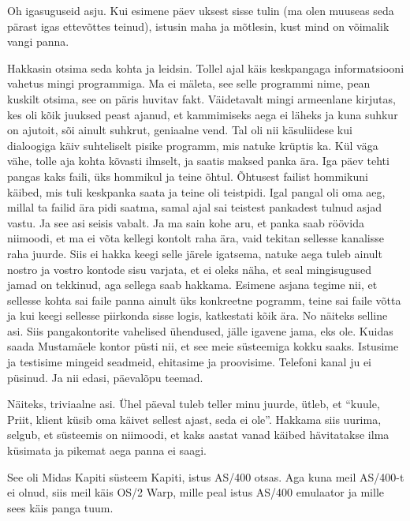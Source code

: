 
Oh igasuguseid asju. Kui esimene päev uksest sisse tulin (ma olen muuseas seda pärast igas ettevõttes teinud), istusin maha ja mõtlesin, kust mind on võimalik vangi panna. 

Hakkasin otsima seda kohta ja leidsin. Tollel ajal käis keskpangaga informatsiooni vahetus mingi programmiga. Ma ei mäleta, see selle programmi nime, pean kuskilt otsima, see on päris huvitav fakt. Väidetavalt mingi armeenlane kirjutas, kes oli kõik juuksed peast ajanud, et kammimiseks aega ei läheks ja kuna suhkur on ajutoit, sõi ainult suhkrut, geniaalne vend. Tal oli nii käsuliidese kui dialoogiga käiv suhteliselt pisike programm, mis natuke krüptis ka. Kül väga vähe, tolle aja kohta kõvasti ilmselt, ja saatis maksed panka ära. Iga päev tehti pangas kaks faili, üks hommikul ja teine õhtul. Õhtusest failist hommikuni käibed, mis tuli keskpanka saata ja teine oli teistpidi. Igal pangal oli oma aeg, millal ta failid ära pidi saatma, samal ajal sai teistest pankadest tulnud asjad vastu. Ja see asi seisis vabalt. Ja ma sain kohe aru, et panka saab röövida niimoodi, et ma ei võta kellegi kontolt raha ära, vaid tekitan sellesse kanalisse raha juurde. Siis ei hakka keegi selle järele igatsema, natuke aega tuleb ainult nostro ja vostro kontode sisu varjata, et ei oleks näha, et seal mingisugused jamad on tekkinud, aga sellega saab hakkama. Esimene asjana tegime nii, et sellesse kohta sai faile panna  ainult üks konkreetne pogramm, teine sai faile võtta ja kui keegi sellesse piirkonda sisse logis, katkestati kõik ära. No näiteks selline asi. Siis  pangakontorite vahelised ühendused, jälle igavene jama, eks ole. Kuidas saada Mustamäele kontor püsti nii, et see meie süsteemiga kokku saaks. Istusime ja testisime mingeid seadmeid, ehitasime ja proovisime. Telefoni kanal ju ei püsinud. Ja nii edasi, päevalõpu teemad. 

Näiteks, triviaalne asi. Ühel päeval tuleb teller minu juurde,  ütleb, et \enquote{kuule, Priit, klient küsib oma käivet sellest ajast, seda ei ole}. Hakkama siis uurima, selgub, et süsteemis on niimoodi, et kaks aastat vanad käibed hävitatakse ilma küsimata ja pikemat aega panna ei saagi. 


See oli Midas Kapiti süsteem Kapiti, istus AS/400 otsas. Aga kuna meil AS/400-t ei olnud, siis meil käis OS/2 Warp, mille peal istus AS/400 emulaator ja mille sees käis panga tuum. 

